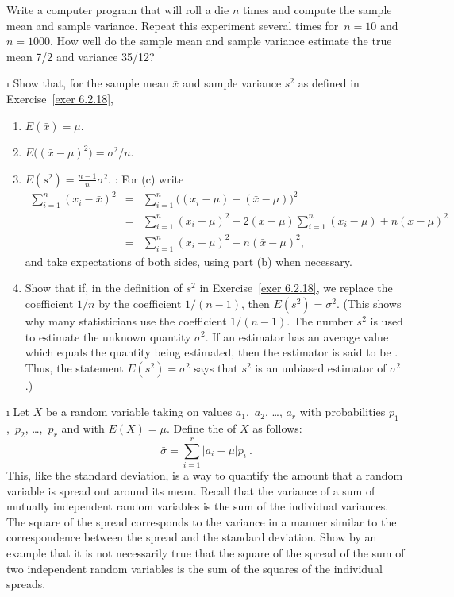 \begin{LJSItem}
Write a computer program that will roll a die $n$ times and compute the sample mean
and sample variance.  Repeat this experiment several times for~$n = 10$ and~$n =
1000$.  How well do the sample mean and sample variance estimate the true mean 7/2
and variance 35/12?

\i\label{exer 6.2.19} Show that, for the sample mean $\bar x$ and sample
variance $s^2$ as defined in Exercise~\ref{exer 6.2.18},
\begin{enumerate}
\item $E(\bar x) = \mu$.

\item $E\bigl((\bar x - \mu)^2\bigr) = \sigma^2/n$.

\item $E(s^2) = \frac {n-1}n\sigma^2$. : For (c) write
\begin{eqnarray*}
\sum_{i = 1}^n (x_i - \bar x)^2 & = & \sum_{i = 1}^n \bigl((x_i - \mu) -
(\bar x - \mu)\bigr)^2 \\
     & = & \sum_{i = 1}^n (x_i - \mu)^2 - 2(\bar x - \mu) \sum_{i = 1}^n (x_i -
\mu) + n(\bar x - \mu)^2 \\
     & = & \sum_{i = 1}^n (x_i - \mu)^2 - n(\bar x - \mu)^2,
\end{eqnarray*} and take expectations of both sides, using part (b) when necessary.

\item Show that if, in the definition of $s^2$ in Exercise~\ref{exer 6.2.18}, we
replace the coefficient $1/n$ by the coefficient $1/(n-1)$, then $E(s^2) = \sigma^2$.
(This shows why many statisticians use the coefficient $1/(n-1)$.  The number $s^2$
is used to estimate the unknown quantity $\sigma^2$.  If an estimator has an average
value which equals the quantity being estimated, then the estimator is said to be
 .  Thus, the statement $E(s^2) = \sigma^2$ says that $s^2$
is an unbiased estimator of $\sigma^2$.)
\end{enumerate}

\i\label{exer 6.2.20} Let $X$ be a random variable taking on values $a_1$,~$a_2$, 
\dots, $a_r$ with probabilities $p_1$,~$p_2$, \dots,~$p_r$ and with $E(X) = \mu$. 
Define the   of $X$ as follows:
$$
\bar\sigma = \sum_{i = 1}^r |a_i - \mu|p_i\ .
$$ This, like the standard deviation, is a way to quantify the amount that a random
variable is spread out around its mean.  Recall that the variance of a sum of
mutually independent random variables is the sum of the individual variances.  The
square of the spread corresponds to the variance in a manner similar to the
correspondence between the spread and the standard deviation.  Show by an example
that it is not necessarily true that the square of the spread of the sum of two
independent random variables is the sum of the squares of the individual spreads.


\end{LJSItem}
